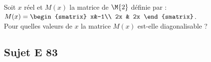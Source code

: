 \documentclass[11pt]{article}
\begin{document}

\begin{exerciceSP}~\\
Soit $x$ réel et $M(x)$ la matrice de $\M{2}$ définie par : 
$M(x)=\begin{smatrix}
x&-1\\ 2x & 2x
\end{smatrix}$.\\
Pour quelles valeurs de $x$ la matrice $M(x)$ est-elle diagonalisable ?
\end{exerciceSP}




\subsection*{Sujet E 83}

\end{document}
